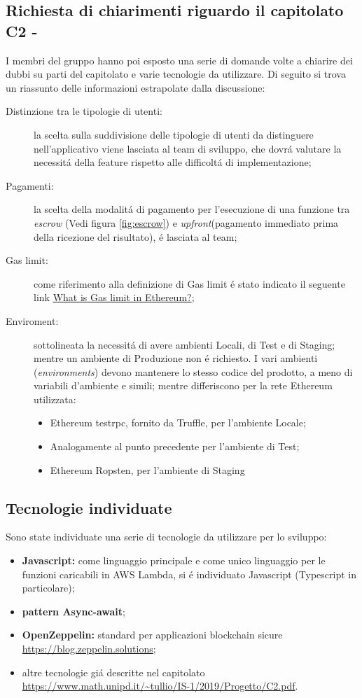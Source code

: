 \subsection{Richiesta di chiarimenti riguardo il capitolato C2 - \NomeProgetto}
I membri del gruppo hanno poi esposto una serie di domande volte a chiarire dei dubbi su parti del capitolato e varie tecnologie da utilizzare.
Di seguito si trova un riassunto delle informazioni estrapolate dalla discussione:
\begin{description}
	\item[Distinzione tra le tipologie di utenti:] la scelta sulla suddivisione delle tipologie di utenti da distinguere nell'applicativo viene lasciata al team di sviluppo, che dovrá valutare la necessitá della feature rispetto alle difficoltá di implementazione;
	\item[Pagamenti:] la scelta della modalitá di pagamento per l'esecuzione di una funzione tra \textit{escrow} (Vedi figura \ref{fig:escrow}) e \textit{upfront}(pagamento immediato prima della ricezione del risultato), é lasciata al team;
	\item[Gas limit:] come riferimento alla definizione di Gas limit é stato indicato il seguente link \href{https://bitcoin.stackexchange.com/questions/39132/what-is-gas-limit-in-ethereum}{What is Gas limit in Ethereum?};
	\item[Enviroment:] sottolineata la necessitá di avere ambienti Locali, di Test e di Staging; mentre un ambiente di Produzione non é richiesto. I vari ambienti (\textit{environments}) devono mantenere lo stesso codice del prodotto, a meno di variabili d'ambiente e simili; mentre differiscono per la rete Ethereum utilizzata:
	\begin{itemize}
		\item Ethereum testrpc, fornito da Truffle, per l'ambiente Locale;
		\item Analogamente al punto precedente per l'ambiente di Test;
		\item Ethereum Ropsten, per l'ambiente di Staging
	\end{itemize}
\end{description}

\subsection{Tecnologie individuate}
Sono state individuate una serie di tecnologie da utilizzare per lo sviluppo:
\begin{itemize}
	\item \textbf{Javascript:} come linguaggio principale e come unico linguaggio per le funzioni caricabili in AWS Lambda, si é individuato Javascript (Typescript in particolare);
	\item \textbf{pattern Async-await};
	\item \textbf{OpenZeppelin:} standard per applicazioni blockchain sicure \url{https://blog.zeppelin.solutions};
	\item altre tecnologie giá descritte nel capitolato \url{https://www.math.unipd.it/~tullio/IS-1/2019/Progetto/C2.pdf}.
\end{itemize}
